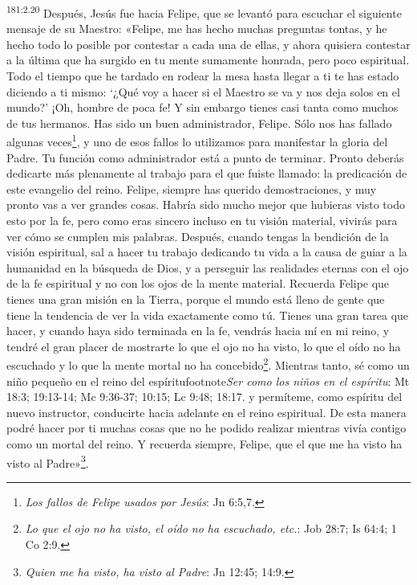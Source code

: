 \par 
\textsuperscript{181:2.20} Después, Jesús fue hacia Felipe, que se levantó para escuchar el siguiente mensaje de su Maestro: «Felipe, me has hecho muchas preguntas tontas, y he hecho todo lo posible por contestar a cada una de ellas, y ahora quisiera contestar a la última que ha surgido en tu mente sumamente honrada, pero poco espiritual. Todo el tiempo que he tardado en rodear la mesa hasta llegar a ti te has estado diciendo a ti mismo: `¿Qué voy a hacer si el Maestro se va y nos deja solos en el mundo?' ¡Oh, hombre de poca fe! Y sin embargo tienes casi tanta como muchos de tus hermanos. Has sido un buen administrador, Felipe. Sólo nos has fallado algunas veces\footnote{\textit{Los fallos de Felipe usados por Jesús}: Jn 6:5,7.}, y uno de esos fallos lo utilizamos para manifestar la gloria del Padre. Tu función como administrador está a punto de terminar. Pronto deberás dedicarte más plenamente al trabajo para el que fuiste llamado: la predicación de este evangelio del reino. Felipe, siempre has querido demostraciones, y muy pronto vas a ver grandes cosas. Habría sido mucho mejor que hubieras visto todo esto por la fe, pero como eras sincero incluso en tu visión material, vivirás para ver cómo se cumplen mis palabras. Después, cuando tengas la bendición de la visión espiritual, sal a hacer tu trabajo dedicando tu vida a la causa de guiar a la humanidad en la búsqueda de Dios, y a perseguir las realidades eternas con el ojo de la fe espiritual y no con los ojos de la mente material. Recuerda Felipe que tienes una gran misión en la Tierra, porque el mundo está lleno de gente que tiene la tendencia de ver la vida exactamente como tú. Tienes una gran tarea que hacer, y cuando haya sido terminada en la fe, vendrás hacia mí en mi reino, y tendré el gran placer de mostrarte lo que el ojo no ha visto, lo que el oído no ha escuchado y lo que la mente mortal no ha concebido\footnote{\textit{Lo que el ojo no ha visto, el oído no ha escuchado, etc.}: Job 28:7; Is 64:4; 1 Co 2:9.}. Mientras tanto, sé como un niño pequeño en el reino del espíritufootnote{\textit{Ser como los niños en el espíritu}: Mt 18:3; 19:13-14; Mc 9:36-37; 10:15; Lc 9:48; 18:17.} y permíteme, como espíritu del nuevo instructor, conducirte hacia adelante en el reino espiritual. De esta manera podré hacer por ti muchas cosas que no he podido realizar mientras vivía contigo como un mortal del reino. Y recuerda siempre, Felipe, que el que me ha visto ha visto al Padre»\footnote{\textit{Quien me ha visto, ha visto al Padre}: Jn 12:45; 14:9.}.

